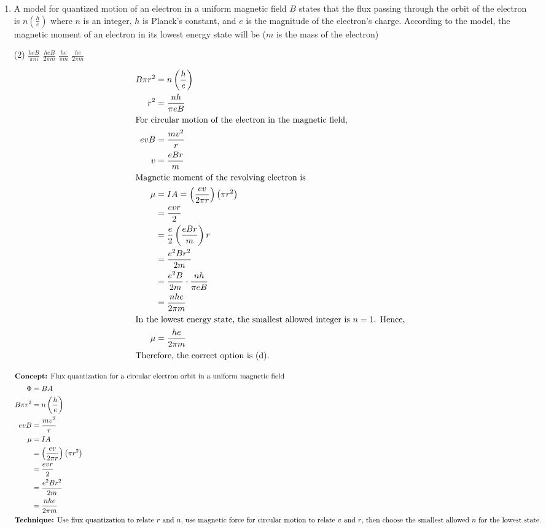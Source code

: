 \begin{enumerate}[leftmargin=*]
\item A model for quantized motion of an electron in a uniform magnetic field $B$ states that the flux passing through the orbit of the electron is $n\left(\frac{h}{e}\right)$ where $n$ is an integer, $h$ is Planck's constant, and $e$ is the magnitude of the electron's charge. According to the model, the magnetic moment of an electron in its lowest energy state will be ($m$ is the mass of the electron)
\begin{tasks}(2)
    \task $\frac{heB}{\pi m}$
    \task $\frac{heB}{2\pi m}$
    \task $\frac{he}{\pi m}$
    \task $\frac{he}{2\pi m}$ \ans
\end{tasks}
\begin{solution}
\begin{align*}
B\pi r^2 &= n\left(\frac{h}{e}\right) \\
r^2 &= \frac{nh}{\pi eB} \\
\intertext{For circular motion of the electron in the magnetic field,}
e v B &= \frac{mv^2}{r} \\
v &= \frac{eBr}{m} \\
\intertext{Magnetic moment of the revolving electron is}
\mu &= IA = \left(\frac{ev}{2\pi r}\right)\left(\pi r^2\right) \\
      &= \frac{evr}{2} \\
      &= \frac{e}{2}\left(\frac{eBr}{m}\right)r \\
      &= \frac{e^2Br^2}{2m} \\
      &= \frac{e^2B}{2m}\cdot \frac{nh}{\pi eB} \\
      &= \frac{nhe}{2\pi m} \\
\intertext{In the lowest energy state, the smallest allowed integer is $n = 1$. Hence,}
\mu &= \frac{he}{2\pi m} \\
\intertext{Therefore, the correct option is (d).}
\end{align*}
\end{solution}

\begin{idea}
    \begin{align*}
    \intertext{\textbf{Concept:} Flux quantization for a circular electron orbit in a uniform magnetic field}
    \Phi &= BA \\
    B\pi r^2 &= n\left(\frac{h}{e}\right) \\
    evB &= \frac{mv^2}{r} \\
    \mu &= IA \\
    &= \left(\frac{ev}{2\pi r}\right)\left(\pi r^2\right) \\
    &= \frac{evr}{2} \\
    &= \frac{e^2Br^2}{2m} \\
    &= \frac{nhe}{2\pi m} \\
    \intertext{\textbf{Technique:} Use flux quantization to relate $r$ and $n$, use magnetic force for circular motion to relate $v$ and $r$, then choose the smallest allowed $n$ for the lowest state.}
    \end{align*}
\end{idea}
\end{enumerate}
